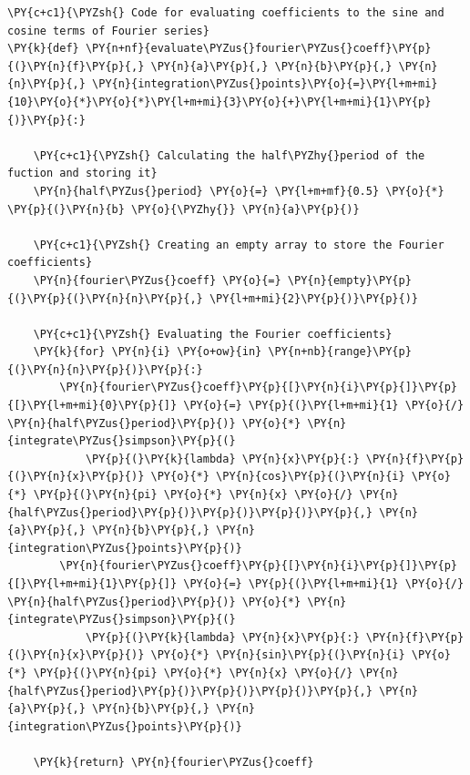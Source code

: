     \begin{tcolorbox}[breakable, size=fbox, boxrule=1pt, pad at break*=1mm,colback=cellbackground, colframe=cellborder]
\begin{Verbatim}[commandchars=\\\{\}]
\PY{c+c1}{\PYZsh{} Code for evaluating coefficients to the sine and cosine terms of Fourier series}
\PY{k}{def} \PY{n+nf}{evaluate\PYZus{}fourier\PYZus{}coeff}\PY{p}{(}\PY{n}{f}\PY{p}{,} \PY{n}{a}\PY{p}{,} \PY{n}{b}\PY{p}{,} \PY{n}{n}\PY{p}{,} \PY{n}{integration\PYZus{}points}\PY{o}{=}\PY{l+m+mi}{10}\PY{o}{*}\PY{o}{*}\PY{l+m+mi}{3}\PY{o}{+}\PY{l+m+mi}{1}\PY{p}{)}\PY{p}{:}

    \PY{c+c1}{\PYZsh{} Calculating the half\PYZhy{}period of the fuction and storing it}
    \PY{n}{half\PYZus{}period} \PY{o}{=} \PY{l+m+mf}{0.5} \PY{o}{*} \PY{p}{(}\PY{n}{b} \PY{o}{\PYZhy{}} \PY{n}{a}\PY{p}{)}

    \PY{c+c1}{\PYZsh{} Creating an empty array to store the Fourier coefficients}
    \PY{n}{fourier\PYZus{}coeff} \PY{o}{=} \PY{n}{empty}\PY{p}{(}\PY{p}{(}\PY{n}{n}\PY{p}{,} \PY{l+m+mi}{2}\PY{p}{)}\PY{p}{)}

    \PY{c+c1}{\PYZsh{} Evaluating the Fourier coefficients}
    \PY{k}{for} \PY{n}{i} \PY{o+ow}{in} \PY{n+nb}{range}\PY{p}{(}\PY{n}{n}\PY{p}{)}\PY{p}{:}
        \PY{n}{fourier\PYZus{}coeff}\PY{p}{[}\PY{n}{i}\PY{p}{]}\PY{p}{[}\PY{l+m+mi}{0}\PY{p}{]} \PY{o}{=} \PY{p}{(}\PY{l+m+mi}{1} \PY{o}{/} \PY{n}{half\PYZus{}period}\PY{p}{)} \PY{o}{*} \PY{n}{integrate\PYZus{}simpson}\PY{p}{(}
            \PY{p}{(}\PY{k}{lambda} \PY{n}{x}\PY{p}{:} \PY{n}{f}\PY{p}{(}\PY{n}{x}\PY{p}{)} \PY{o}{*} \PY{n}{cos}\PY{p}{(}\PY{n}{i} \PY{o}{*} \PY{p}{(}\PY{n}{pi} \PY{o}{*} \PY{n}{x} \PY{o}{/} \PY{n}{half\PYZus{}period}\PY{p}{)}\PY{p}{)}\PY{p}{)}\PY{p}{,} \PY{n}{a}\PY{p}{,} \PY{n}{b}\PY{p}{,} \PY{n}{integration\PYZus{}points}\PY{p}{)}
        \PY{n}{fourier\PYZus{}coeff}\PY{p}{[}\PY{n}{i}\PY{p}{]}\PY{p}{[}\PY{l+m+mi}{1}\PY{p}{]} \PY{o}{=} \PY{p}{(}\PY{l+m+mi}{1} \PY{o}{/} \PY{n}{half\PYZus{}period}\PY{p}{)} \PY{o}{*} \PY{n}{integrate\PYZus{}simpson}\PY{p}{(}
            \PY{p}{(}\PY{k}{lambda} \PY{n}{x}\PY{p}{:} \PY{n}{f}\PY{p}{(}\PY{n}{x}\PY{p}{)} \PY{o}{*} \PY{n}{sin}\PY{p}{(}\PY{n}{i} \PY{o}{*} \PY{p}{(}\PY{n}{pi} \PY{o}{*} \PY{n}{x} \PY{o}{/} \PY{n}{half\PYZus{}period}\PY{p}{)}\PY{p}{)}\PY{p}{)}\PY{p}{,} \PY{n}{a}\PY{p}{,} \PY{n}{b}\PY{p}{,} \PY{n}{integration\PYZus{}points}\PY{p}{)}

    \PY{k}{return} \PY{n}{fourier\PYZus{}coeff}
\end{Verbatim}
\end{tcolorbox}

